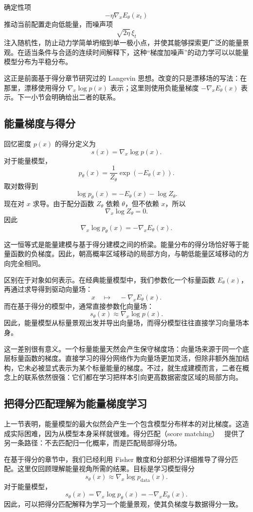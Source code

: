 确定性项
\[
-\eta\nabla_x E_\theta(x_t)
\]
推动当前配置走向低能量，而噪声项
\[
\sqrt{2\eta}\,\xi_t
\]
注入随机性，防止动力学简单坍缩到单一极小点，并使其能够探索更广泛的能量景观。在适当条件与合适的连续时间解释下，这种“梯度加噪声”的动力学可以以能量模型分布为平稳分布。

这正是前面基于得分章节研究过的 Langevin 思想。改变的只是漂移场的写法：在那里，漂移使用得分 $\nabla_x\log p(x)$ 表示；这里则使用负能量梯度 $-\nabla_xE_\theta(x)$ 表示。下一小节会明确给出二者的联系。

\subsection{能量梯度与得分}

回忆密度 $p(x)$ 的得分定义为
\[
s(x)
=
\nabla_x\log p(x).
\]
对于能量模型，
\[
p_\theta(x)
=
\frac{1}{Z_\theta}\exp(-E_\theta(x)).
\]
取对数得到
\[
\log p_\theta(x)
=
-E_\theta(x)-\log Z_\theta.
\]
现在对 $x$ 求导。由于配分函数 $Z_\theta$ 依赖 $\theta$，但不依赖 $x$，所以
\[
\nabla_x\log Z_\theta=0.
\]
因此
\[
\boxed{
\nabla_x\log p_\theta(x)
=
-\nabla_xE_\theta(x).
}
\]

这一恒等式是能量建模与基于得分建模之间的桥梁。能量分布的得分场恰好等于能量函数的负梯度。因此，朝高概率区域移动的局部方向，与朝低能量区域移动的方向完全相同。

区别在于对象如何表示。在经典能量模型中，我们参数化一个标量函数 $E_\theta(x)$，再通过求导得到驱动向量场：
\[
x
\quad\longmapsto\quad
-\nabla_xE_\theta(x).
\]
而在基于得分的模型中，通常直接参数化向量场：
\[
s_\theta(x)
\approx
\nabla_x\log p(x).
\]
因此，能量模型从标量景观出发并导出向量场，而得分模型往往直接学习向量场本身。

这一差别很有意义。一个标量能量天然会产生保守梯度场：向量场来源于同一个底层标量函数的梯度。直接学习的得分网络作为向量场更加灵活，但除非额外施加结构，它未必被显式表示为某个标量能量的梯度。不过，就生成建模而言，二者在概念上的联系依然很强：它们都在学习把样本引向更高数据密度区域的局部方向。

\subsection{把得分匹配理解为能量梯度学习}

上一节表明，能量模型的最大似然会产生一个包含模型分布样本的对比梯度。这造成实际困难，因为从模型本身采样就很难。得分匹配（score matching）~\cite{hyvarinen2005estimation} 提供了另一条路径：不去匹配归一化概率，而是匹配局部得分场。

在基于得分的章节中，我们已经利用 Fisher 散度和分部积分详细推导了得分匹配。这里仅回顾理解能量视角所需的结果。目标是学习模型得分
\[
s_\theta(x)
\approx
\nabla_x\log p_{\text{data}}(x).
\]
对于能量模型，
\[
s_\theta(x)
=
\nabla_x\log p_\theta(x)
=
-\nabla_xE_\theta(x).
\]
因此，可以把得分匹配解释为学习一个能量景观，使其负梯度与数据得分一致。

